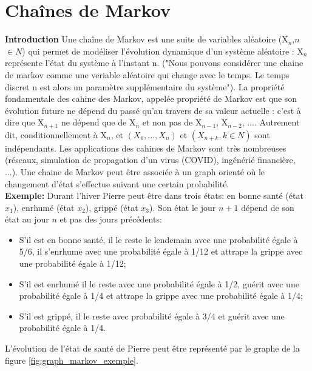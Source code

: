 
\section{Chaînes de Markov}

\textbf{Introduction} Une chaîne de Markov est une suite de variables aléatoire (X$_n$,$n$ $\in N$) qui permet de modéliser l'évolution dynamique d’un système aléatoire : X$_n$ représente l’état du système à l’instant n. ("Nous pouvons considérer une chaine de markov comme une veriable aléatoire qui change avec le temps. Le temps discret n est alors un paramètre supplémentaire du système"). La propriété fondamentale des cahine des Markov, appelée propriété de Markov est que son évolution future ne dépend du passé qu'au travers de sa valeur actuelle : c'est à dire que X$_{n+1}$ ne dépend que de X$_n$ et non pas de  X$_{n-1}$,  X$_{n-2}$, .... Autrement dit, conditionnellement à  X$_{n}$, et $(X_0, ..., X_n)$ et $(X_{n+k}, k \in N)$ sont indépendants. Les applications des cahines de Markov sont très nombreuses (réseaux, simulation de propagation d'un virus (COVID), ingénérié financière, ...). Une chaine de Markov peut être associée à un graph orienté où le changement d'état s'effectue suivant une certain probabilité. \\

\noindent \textbf{Exemple:} Durant l’hiver Pierre peut être dans trois états: en bonne santé (état $x_1$), enrhumé (état $x_2$), grippé (état $x_3$). Son état le jour $n+1$ dépend de son état au jour $n$ et pas des jours précédents:
\begin{itemize}
    \item S’il est en bonne santé, il le reste le lendemain avec une probabilité égale à 5/6, il s’enrhume avec une probabilité égale à 1/12 et attrape la grippe avec une probabilité égale à 1/12;
    \item S’il est enrhumé il le reste avec une probabilité égale à 1/2, guérit avec une probabilité égale à 1/4 et attrape la grippe
avec une probabilité égale à 1/4;
    \item S’il est grippé, il le reste avec probabilité égale à 3/4 et guérit avec une probabilité égale à 1/4.
\end{itemize}

L’évolution de l’état de santé de Pierre peut être représenté par le graphe de la figure \ref{fig:graph_markov_exemple}.

